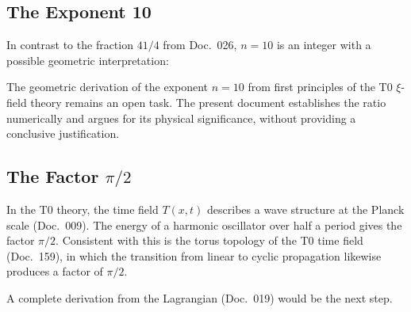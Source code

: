 \subsection{The Exponent 10}

In contrast to the fraction $41/4$ from Doc.~026, $n = 10$ is an integer
with a possible geometric interpretation:

\begin{table}[H]
    \centering
    \caption{Possible interpretations of the exponent $n=10$.
    Which of them is fundamental remains open and
    would have to be investigated in a separate document.}
    \label{tab:exp10}
\end{table}

\begin{important}
    The geometric derivation of the exponent $n = 10$ from
    first principles of the T0 $\xi$-field theory remains an open task.
    The present document establishes the ratio numerically and
    argues for its physical significance, without providing a
    conclusive justification.
\end{important}

\subsection{The Factor \texorpdfstring{$\pi/2$}{pi/2}}

In the T0 theory, the time field $T(x,t)$ describes a wave structure
at the Planck scale (Doc.~009). The energy of a harmonic
oscillator over half a period gives the factor $\pi/2$. Consistent
with this is the torus topology of the T0 time field (Doc.~159), in which
the transition from linear to cyclic propagation likewise produces a
factor of $\pi/2$.

A complete derivation from the Lagrangian (Doc.~019) would be the
next step.

